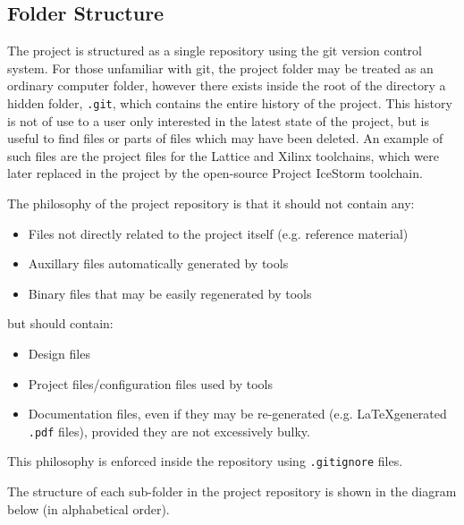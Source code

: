 \clearpage
\begin{appendices}
	
\chapter{Folder Structure} \label{sec:folder-struct}

The project is structured as a single repository using the git version control system. For those unfamiliar with git, the project folder may be treated as an ordinary computer folder, however there exists inside the root of the directory a hidden folder, \texttt{.git}, which contains the entire history of the project. This history is not of use to a user only interested in the latest state of the project, but is useful to find files or parts of files which may have been deleted. An example of such files are the project files for the Lattice and Xilinx toolchains, which were later replaced in the project by the open-source Project IceStorm toolchain.

The philosophy of the project repository is that it should not contain any:
\begin{itemize}
	\item Files not directly related to the project itself (e.g. reference material)
	\item Auxillary files automatically generated by tools
	\item Binary files that may be easily regenerated by tools
\end{itemize}
but should contain:
\begin{itemize}
	\item Design files
	\item Project files/configuration files used by tools
	\item Documentation files, even if they may be re-generated (e.g. \LaTeX generated \texttt{.pdf} files), provided they are not excessively bulky.
\end{itemize}
This philosophy is enforced inside the repository using \texttt{.gitignore} files.


The structure of each sub-folder in the project repository is shown in the diagram below (in alphabetical order).


\end{appendices}
